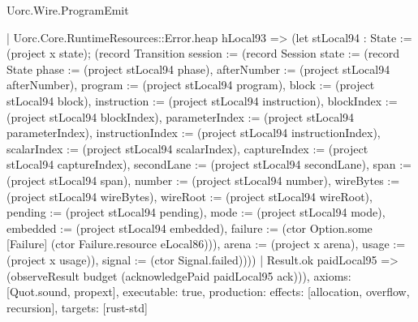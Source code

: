 \begin{lexlean}{Uorc.Wire.ProgramEmit}
\begin{semanticmodule}
{      | Uorc.Core.RuntimeResources::Error.heap hLocal93 => (let stLocal94 : State := (project x state); (record Transition {session := (record Session {state := (record State {phase := (project stLocal94 phase), afterNumber := (project stLocal94 afterNumber), program := (project stLocal94 program), block := (project stLocal94 block), instruction := (project stLocal94 instruction), blockIndex := (project stLocal94 blockIndex), parameterIndex := (project stLocal94 parameterIndex), instructionIndex := (project stLocal94 instructionIndex), scalarIndex := (project stLocal94 scalarIndex), captureIndex := (project stLocal94 captureIndex), secondLane := (project stLocal94 secondLane), span := (project stLocal94 span), number := (project stLocal94 number), wireBytes := (project stLocal94 wireBytes), wireRoot := (project stLocal94 wireRoot), pending := (project stLocal94 pending), mode := (project stLocal94 mode), embedded := (project stLocal94 embedded), failure := (ctor Option.some [Failure] (ctor Failure.resource eLocal86))}), arena := (project x arena), usage := (project x usage)}), signal := (ctor Signal.failed)})))
    | Result.ok paidLocal95 => (observeResult budget (acknowledgePaid paidLocal95 ack))),
  axioms: [Quot.sound, propext],
  executable: true,
  production: {effects: [allocation, overflow, recursion], targets: [rust-std]}
}


\end{semanticmodule}
\end{lexlean}
